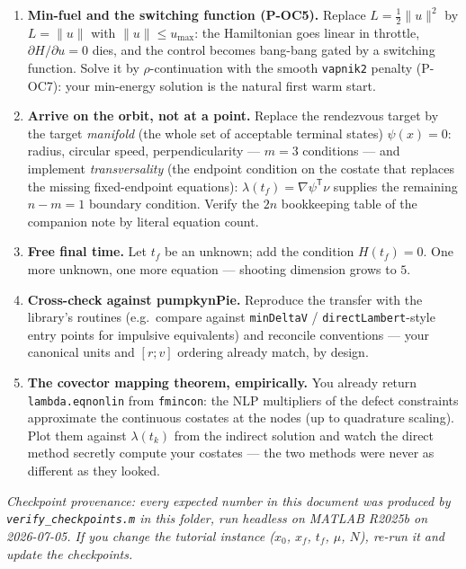 \documentclass[11pt,letterpaper]{article}
\newcommand{\T}{^{\mathsf{T}}}
\newcommand{\half}{\tfrac12}
\begin{document}
\begin{enumerate}[leftmargin=*]
\item \textbf{Min-fuel and the switching function (P-OC5).} Replace
  $L = \half\|u\|^2$ by $L = \|u\|$ with $\|u\| \le u_{\max}$: the
  Hamiltonian goes linear in throttle, $\partial H/\partial u = 0$ dies, and
  the control becomes bang-bang gated by a switching function. Solve it by
  $\rho$-continuation with the smooth \texttt{vapnik2} penalty (P-OC7):
  your min-energy solution is the natural first warm start.
\item \textbf{Arrive on the orbit, not at a point.} Replace the rendezvous
  target by the target \emph{manifold} (the whole set of acceptable terminal
  states) $\psi(x) = 0$: radius, circular speed, perpendicularity --- $m = 3$
  conditions --- and implement \emph{transversality} (the endpoint condition
  on the costate that replaces the missing fixed-endpoint equations):
  $\lambda(t_f) = \nabla\psi\T\nu$ supplies the remaining $n - m = 1$
  boundary condition. Verify the $2n$ bookkeeping table of the companion
  note by literal equation count.
\item \textbf{Free final time.} Let $t_f$ be an unknown; add the condition
  $H(t_f) = 0$. One more unknown, one more equation --- shooting dimension
  grows to $5$.
\item \textbf{Cross-check against pumpkynPie.} Reproduce the transfer with
  the library's routines (e.g.\ compare against \texttt{minDeltaV} /
  \texttt{directLambert}-style entry points for impulsive equivalents) and
  reconcile conventions --- your canonical units and $[r; v]$ ordering
  already match, by design.
\item \textbf{The covector mapping theorem, empirically.} You already return
  \texttt{lambda.eqnonlin} from \texttt{fmincon}: the NLP multipliers of the
  defect constraints approximate the continuous costates at the nodes (up to
  quadrature scaling). Plot them against $\lambda(t_k)$ from the indirect
  solution and watch the direct method secretly compute your costates ---
  the two methods were never as different as they looked.
\end{enumerate}

\bigskip
\noindent\emph{Checkpoint provenance: every expected number in this document
was produced by \texttt{verify\_checkpoints.m} in this folder, run headless
on MATLAB R2025b on 2026-07-05. If you change the tutorial instance
($x_0$, $x_f$, $t_f$, $\mu$, $N$), re-run it and update the checkpoints.}
\end{document}
